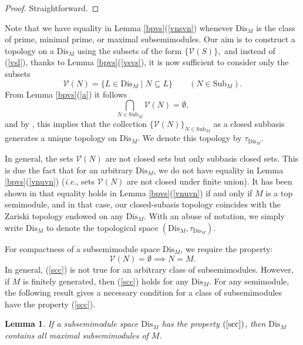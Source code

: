 \documentclass[12pt,english]{smfart}
\newtheorem{lemma}[theorem]{Lemma}
\theoremstyle{definition}
\begin{document}
\begin{proof}
Straightforward.
\end{proof}

Note that we have equality in Lemma \ref{bpvs}(\ref{vnsvn}) whenever $\mathrm{Dis}_M$ is the class of prime, minimal prime, or maximal subsemimodules.
Our aim is to construct a topology on a $\mathrm{Dis}_M$ using the subsets of the form $\{\mathcal{V}(S)\},$ and instead of (\ref{vsl}), thanks to Lemma \ref{bpvs}(\ref{vsvs}), it is now sufficient to consider only the subsets
\begin{equation}
\mathcal{V}(N)=\{L\in \mathrm{Dis}_M\mid N\subseteq L\}\qquad (N\in \mathrm{Sub}_M).
\end{equation}
From Lemma \ref{bpvs}(\ref{a}) it follows \[\bigcap_{N\in \mathrm{Sub}_M} \mathcal{V}(N)=\emptyset,\] and by \cite[Theorem\,15\,A.13., p.\,254]{C66}, this implies that the collection $\{\mathcal{V}(N)\}_{N\in \mathrm{Sub}_M}$ as  a closed subbasis generates a unique topology on  $\mathrm{Dis}_M$. We denote this topology by $\tau_{\mathrm{Dis}_M}$. 

In general, the sets $\mathcal{V}(N)$ are not closed sets but only subbasis closed sets. This is due the fact that for an arbitrary $\mathrm{Dis}_M$, we do not have equality in Lemma \ref{bpvs}(\ref{vnuvn}) (\textit{i.e.}, sets $\mathcal{V}(N)$ are not closed under finite union). It has been shown in \cite[Lemma 3.2]{HPH21} that equality holds in Lemma \ref{bpvs}(\ref{vnuvn}) if and only if $M$ is a top semimodule, and in that case, our closed-subasis topology coincides with the Zariski topology endowed on any $\mathrm{Dis}_M$. With an abuse of notation, we simply write $\mathrm{Dis}_M$ to denote the topological space $(\mathrm{Dis}_M, \tau_{\mathrm{Dis}_M})$. 

For compactness of a subsemimodule space $\mathrm{Dis}_M$, we require the property:
\begin{equation}\label{scc}
\mathcal{V}(N)=\emptyset \implies N=M.
\end{equation}
In general, (\ref{scc}) is not true for an arbitrary class of subsemimodules. However, if $M$ is finitely generated, then (\ref{scc}) holds for any $\mathrm{Dis}_M$. For any semimodule, the following result gives a necessary condition for a class of subsemimodules have the property (\ref{scc}). 

\begin{lemma}\label{ncc}
If a subsemimodule space $\mathrm{Dis}_M$ has the property $(\ref{scc})$, then $\mathrm{Dis}_M$ contains all maximal subsemimodules of $M$.
\end{lemma}
\end{document}
